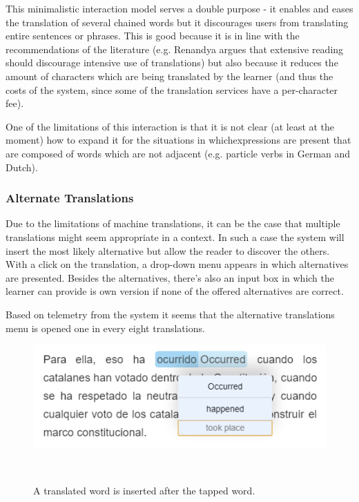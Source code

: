 This minimalistic interaction model serves a double purpose - it enables and eases the translation of several chained words but it discourages users from translating entire sentences or phrases. This is good because it is in line with the recommendations of the literature (e.g. Renandya argues that extensive reading should discourage intensive use of translations\cite{renadya07-power}) but also because it reduces the amount of characters which are being translated by the learner (and thus the costs of the system, since some of the translation services have a per-character fee). 

One of the limitations of this interaction is that it is not clear (at least at the moment) how to expand it for the situations in whichexpressions are present that are composed of words which are not adjacent (e.g. particle verbs in German and Dutch).


\subsubsection{Alternate Translations}
Due to the limitations of machine translations, it can be the case that multiple translations might seem appropriate in a context. In such a case the system will insert the most likely alternative but allow the reader to discover the others. With a click on the translation, a drop-down menu appears in which alternatives are presented. Besides the alternatives, there's also an input box in which the learner can provide is own version if none of the offered alternatives are correct. 

Based on telemetry from the system it seems that  the alternative translations menu is opened one in every eight translations. 

\begin{figure}[h!]
\centering
  \includegraphics[width=0.8\columnwidth]{figures/translation_alter_menu}
  \caption{A translated word is inserted after the tapped word.}~\label{fig:registrations}
\end{figure}

